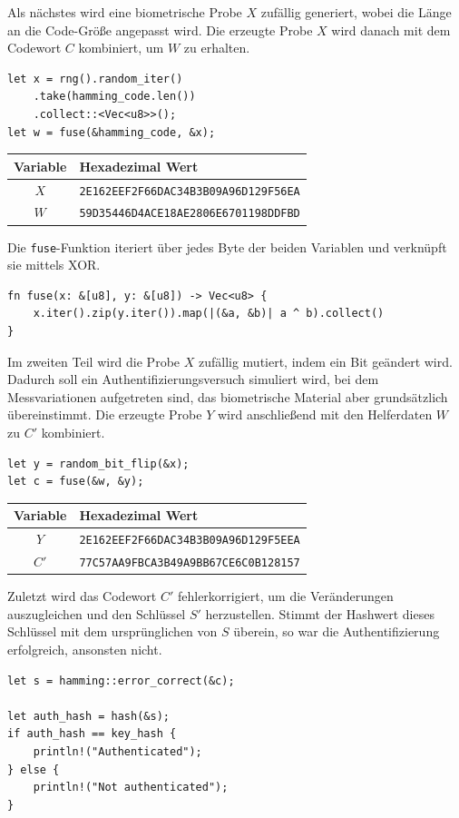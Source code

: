 \documentclass{article}
\begin{document}
    Als nächstes wird eine biometrische Probe $X$ zufällig generiert, wobei die Länge an die Code-Größe angepasst wird.
    Die erzeugte Probe $X$ wird danach mit dem Codewort $C$ kombiniert, um $W$ zu erhalten. 
    \begin{verbatim}
let x = rng().random_iter()
    .take(hamming_code.len())
    .collect::<Vec<u8>>();
let w = fuse(&hamming_code, &x);
    \end{verbatim}
    \begin{center}
        \begin{tabular}{cl}
            Variable & Hexadezimal Wert\\\hline
            $X$ & \verb|2E162EEF2F66DAC34B3B09A96D129F56EA|\\
            $W$ & \verb|59D35446D4ACE18AE2806E6701198DDFBD|
        \end{tabular}
    \end{center}
    Die \verb|fuse|-Funktion iteriert über jedes Byte der beiden Variablen und verknüpft sie mittels XOR.
    \begin{verbatim}
fn fuse(x: &[u8], y: &[u8]) -> Vec<u8> {
    x.iter().zip(y.iter()).map(|(&a, &b)| a ^ b).collect()
}
    \end{verbatim}
    Im zweiten Teil wird die Probe $X$ zufällig mutiert, indem ein Bit geändert wird. Dadurch soll ein 
    Authentifizierungsversuch simuliert wird, bei dem Messvariationen aufgetreten sind, das biometrische Material
    aber grundsätzlich übereinstimmt. Die erzeugte Probe $Y$ wird anschließend mit den Helferdaten $W$ zu $C'$ kombiniert.
    \begin{verbatim}
let y = random_bit_flip(&x);
let c = fuse(&w, &y);
    \end{verbatim}
    \begin{center}
        \begin{tabular}{cl}
            Variable & Hexadezimal Wert\\\hline
            $Y$ & \verb|2E162EEF2F66DAC34B3B09A96D129F5EEA|\\
            $C'$ & \verb|77C57AA9FBCA3B49A9BB67CE6C0B128157|
        \end{tabular}
    \end{center}
    Zuletzt wird das Codewort $C'$ fehlerkorrigiert, um die Veränderungen auszugleichen und den Schlüssel $S'$ 
    herzustellen. Stimmt der Hashwert dieses Schlüssel mit dem ursprünglichen von $S$ überein, so war die 
    Authentifizierung erfolgreich, ansonsten nicht.
    \begin{verbatim}
let s = hamming::error_correct(&c);

let auth_hash = hash(&s);
if auth_hash == key_hash {
    println!("Authenticated");
} else {
    println!("Not authenticated");
}
    \end{verbatim}
\end{document}
